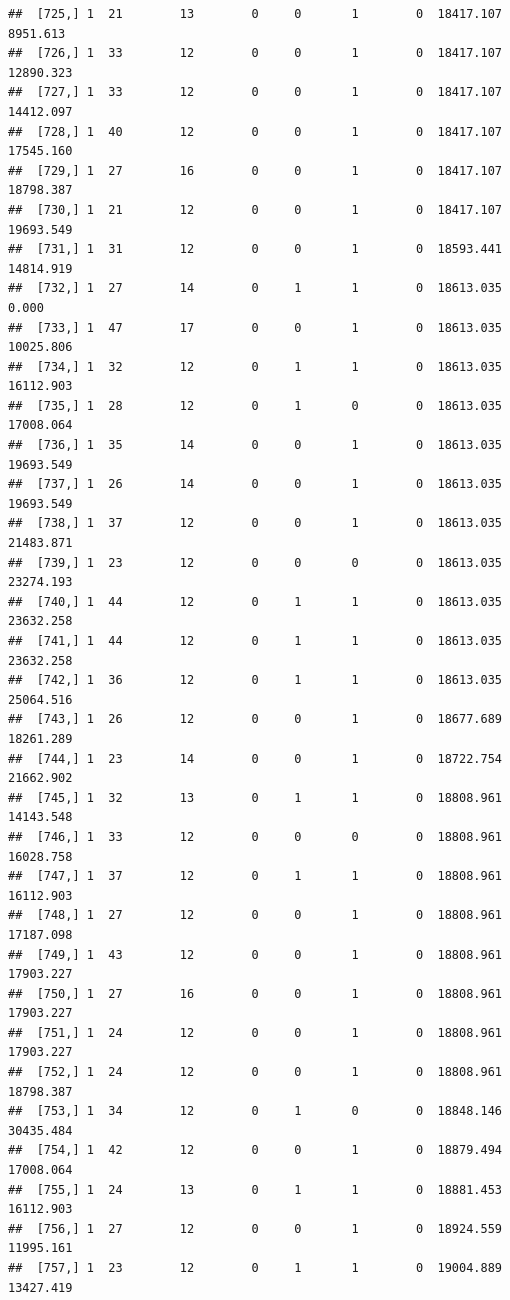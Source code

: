 \documentclass[
]{article}
\begin{document}
\begin{verbatim}
##  [725,] 1  21        13        0     0       1        0  18417.107   8951.613
##  [726,] 1  33        12        0     0       1        0  18417.107  12890.323
##  [727,] 1  33        12        0     0       1        0  18417.107  14412.097
##  [728,] 1  40        12        0     0       1        0  18417.107  17545.160
##  [729,] 1  27        16        0     0       1        0  18417.107  18798.387
##  [730,] 1  21        12        0     0       1        0  18417.107  19693.549
##  [731,] 1  31        12        0     0       1        0  18593.441  14814.919
##  [732,] 1  27        14        0     1       1        0  18613.035      0.000
##  [733,] 1  47        17        0     0       1        0  18613.035  10025.806
##  [734,] 1  32        12        0     1       1        0  18613.035  16112.903
##  [735,] 1  28        12        0     1       0        0  18613.035  17008.064
##  [736,] 1  35        14        0     0       1        0  18613.035  19693.549
##  [737,] 1  26        14        0     0       1        0  18613.035  19693.549
##  [738,] 1  37        12        0     0       1        0  18613.035  21483.871
##  [739,] 1  23        12        0     0       0        0  18613.035  23274.193
##  [740,] 1  44        12        0     1       1        0  18613.035  23632.258
##  [741,] 1  44        12        0     1       1        0  18613.035  23632.258
##  [742,] 1  36        12        0     1       1        0  18613.035  25064.516
##  [743,] 1  26        12        0     0       1        0  18677.689  18261.289
##  [744,] 1  23        14        0     0       1        0  18722.754  21662.902
##  [745,] 1  32        13        0     1       1        0  18808.961  14143.548
##  [746,] 1  33        12        0     0       0        0  18808.961  16028.758
##  [747,] 1  37        12        0     1       1        0  18808.961  16112.903
##  [748,] 1  27        12        0     0       1        0  18808.961  17187.098
##  [749,] 1  43        12        0     0       1        0  18808.961  17903.227
##  [750,] 1  27        16        0     0       1        0  18808.961  17903.227
##  [751,] 1  24        12        0     0       1        0  18808.961  17903.227
##  [752,] 1  24        12        0     0       1        0  18808.961  18798.387
##  [753,] 1  34        12        0     1       0        0  18848.146  30435.484
##  [754,] 1  42        12        0     0       1        0  18879.494  17008.064
##  [755,] 1  24        13        0     1       1        0  18881.453  16112.903
##  [756,] 1  27        12        0     0       1        0  18924.559  11995.161
##  [757,] 1  23        12        0     1       1        0  19004.889  13427.419

\end{verbatim}
\end{document}
